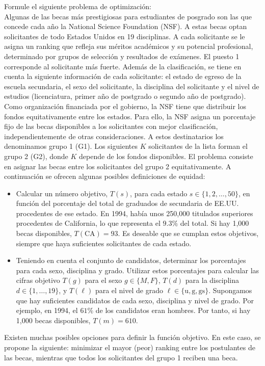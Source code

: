 Formule el siguiente problema de optimización: \\

Algunas de las becas más prestigiosas para estudiantes de posgrado son las que concede cada año la National Science Foundation (NSF). A estas becas optan solicitantes de todo Estados Unidos en 19 disciplinas. A cada solicitante se le asigna un ranking que refleja sus méritos académicos y su potencial profesional, determinado por grupos de selección y resultados de exámenes. El puesto 1 corresponde al solicitante más fuerte. Además de la clasificación, se tiene en cuenta la siguiente información de cada solicitante: el estado de egreso de la escuela secundaria, el sexo del solicitante, la disciplina del solicitante y el nivel de estudios (licenciatura, primer año de postgrado o segundo año de postgrado). \\

Como organización financiada por el gobierno, la NSF tiene que distribuir los fondos equitativamente entre los estados. Para ello, la NSF asigna un porcentaje fijo de las becas disponibles a los solicitantes con mejor clasificación, independientemente de otras consideraciones. A estos destinatarios los denominamos grupo 1 (G1). Los siguientes $K$ solicitantes de la lista forman el grupo 2 (G2), donde $K$ depende de los fondos disponibles. El problema consiste en asignar las becas entre los solicitantes del grupo 2 equitativamente. A continuación se ofrecen algunas posibles definiciones de equidad:

\begin{itemize}
    \item[(a)] Calcular un número objetivo, $T(s)$, para cada estado $s \in \{1,2,\dots,50\}$, en función del porcentaje del total de graduados de secundaria de EE.UU. procedentes de ese estado. En 1994, había unos 250{,}000 titulados superiores procedentes de California, lo que representa el $9.3\%$ del total. Si hay 1{,}000 becas disponibles, $T(\text{CA}) = 93$. Es deseable que se cumplan estos objetivos, siempre que haya suficientes solicitantes de cada estado.
    
    \item[(b)] Teniendo en cuenta el conjunto de candidatos, determinar los porcentajes para cada sexo, disciplina y grado. Utilizar estos porcentajes para calcular las cifras objetivo $T(g)$ para el sexo $g \in \{M,F\}$, $T(d)$ para la disciplina $d \in \{1,\dots,19\}$, y $T(\ell)$ para el nivel de grado $\ell \in \{\text{u}, \text{g}, \text{gs}\}$. Supongamos que hay suficientes candidatos de cada sexo, disciplina y nivel de grado. Por ejemplo, en 1994, el $61\%$ de los candidatos eran hombres. Por tanto, si hay 1{,}000 becas disponibles, $T(m)=610$.
\end{itemize}

Existen muchas posibles opciones para definir la función objetivo. En este caso, se propone la siguiente: minimizar el mayor (peor) ranking entre los postulantes de las becas, mientras que todos los solicitantes del grupo 1 reciben una beca.\\
